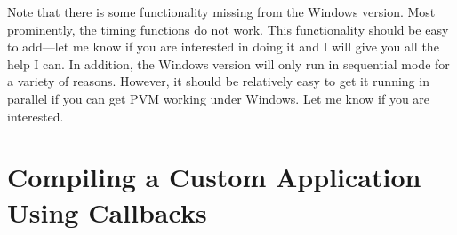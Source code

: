 Note that there is some functionality missing from the Windows version. Most
prominently, the timing functions do not work. This functionality
should be easy to add---let me know if you are interested in doing it and I
will give you all the help I can. In addition, the Windows version will only
run in sequential mode for a variety of reasons. However, it should be
relatively easy to get it running in parallel if you can get PVM working under
Windows. Let me know if you are interested.






\section{Compiling a Custom Application Using Callbacks}

